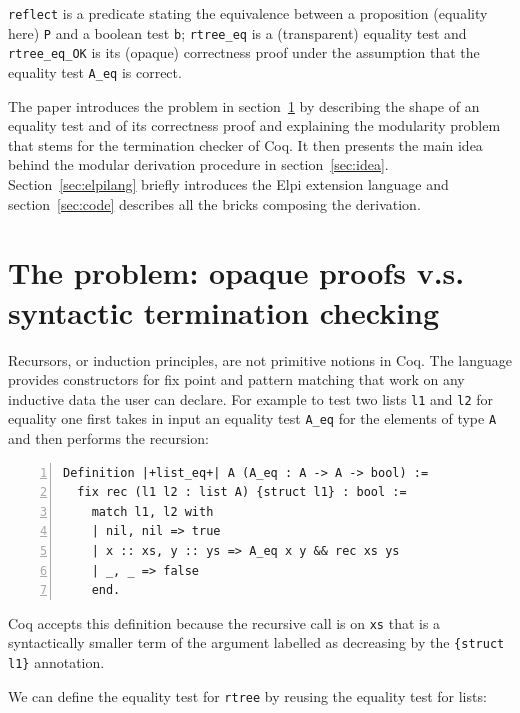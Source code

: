 \documentclass[a4paper,UKenglish,cleveref, autoref]{lipics-v2019}
\begin{document}
\noindent
\lstinline+reflect+
is a predicate stating the equivalence between a proposition (equality here)
\lstinline+P+ and a boolean test \lstinline+b+;
\lstinline+rtree_eq+ is a (transparent) equality test and
\lstinline+rtree_eq_OK+ is its (opaque) correctness proof
under the assumption that the equality test \lstinline+A_eq+ is correct.

The paper introduces the problem in
section~\ref{sec:problem} by describing the shape of an equality test
and of its correctness proof and explaining the modularity problem
that stems for the termination checker of Coq. It then
presents the main idea behind the
modular derivation procedure in section~\ref{sec:idea}.
Section~\ref{sec:elpilang} briefly introduces the Elpi extension language
and section~\ref{sec:code} describes all the bricks composing the
derivation.


\section{The problem: opaque proofs v.s. syntactic termination checking} %
\label{sec:problem}

Recursors, or induction principles, are not primitive notions in Coq.
The language provides constructors for fix point and pattern matching
that work on any inductive data the user can declare.
For example to test two lists \lstinline+l1+ and \lstinline+l2+ for
equality one first takes in input an equality test \lstinline+A_eq+
for the elements of type \lstinline+A+ and then performs the
recursion:

\begin{lstlisting}[numbers=left]
Definition |+list_eq+| A (A_eq : A -> A -> bool) :=
  fix rec (l1 l2 : list A) {struct l1} : bool :=
    match l1, l2 with
    | nil, nil => true
    | x :: xs, y :: ys => A_eq x y && rec xs ys
    | _, _ => false
    end.
\end{lstlisting}

\noindent
Coq accepts this definition because
the recursive call is on \lstinline+xs+ that is a syntactically
smaller term of the argument
labelled as decreasing by the \lstinline+{struct l1}+
annotation.

We can define the equality test for \lstinline+rtree+
by reusing the equality test for lists:
\end{document}
